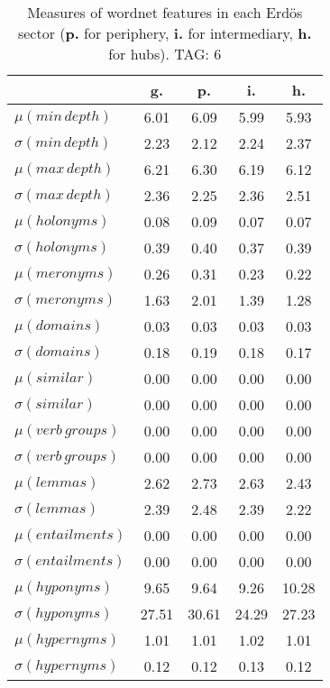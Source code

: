 \begin{table}[h!]
\begin{center}
\begin{tabular}{| l | c | c | c | c |}\hline
 & g. & p. & i. & h. \\\hline
$\mu(min\,depth)$ & 6.01  & 6.09  & 5.99  & 5.93 \\\hline
$\sigma(min\,depth)$ & 2.23  & 2.12  & 2.24  & 2.37 \\\hline
$\mu(max\,depth)$ & 6.21  & 6.30  & 6.19  & 6.12 \\\hline
$\sigma(max\,depth)$ & 2.36  & 2.25  & 2.36  & 2.51 \\\hline
$\mu(holonyms)$ & 0.08  & 0.09  & 0.07  & 0.07 \\\hline
$\sigma(holonyms)$ & 0.39  & 0.40  & 0.37  & 0.39 \\\hline
$\mu(meronyms)$ & 0.26  & 0.31  & 0.23  & 0.22 \\\hline
$\sigma(meronyms)$ & 1.63  & 2.01  & 1.39  & 1.28 \\\hline
$\mu(domains)$ & 0.03  & 0.03  & 0.03  & 0.03 \\\hline
$\sigma(domains)$ & 0.18  & 0.19  & 0.18  & 0.17 \\\hline
$\mu(similar)$ & 0.00  & 0.00  & 0.00  & 0.00 \\\hline
$\sigma(similar)$ & 0.00  & 0.00  & 0.00  & 0.00 \\\hline
$\mu(verb\,groups)$ & 0.00  & 0.00  & 0.00  & 0.00 \\\hline
$\sigma(verb\,groups)$ & 0.00  & 0.00  & 0.00  & 0.00 \\\hline
$\mu(lemmas)$ & 2.62  & 2.73  & 2.63  & 2.43 \\\hline
$\sigma(lemmas)$ & 2.39  & 2.48  & 2.39  & 2.22 \\\hline
$\mu(entailments)$ & 0.00  & 0.00  & 0.00  & 0.00 \\\hline
$\sigma(entailments)$ & 0.00  & 0.00  & 0.00  & 0.00 \\\hline
$\mu(hyponyms)$ & 9.65  & 9.64  & 9.26  & 10.28 \\\hline
$\sigma(hyponyms)$ & 27.51  & 30.61  & 24.29  & 27.23 \\\hline
$\mu(hypernyms)$ & 1.01  & 1.01  & 1.02  & 1.01 \\\hline
$\sigma(hypernyms)$ & 0.12  & 0.12  & 0.13  & 0.12 \\\hline
\end{tabular}
\caption{Measures of wordnet features in each Erd\"os sector ({{\bf p.}} for periphery, {{\bf i.}} for intermediary, {{\bf h.}} for hubs). TAG: 6}
\end{center}
\end{table}